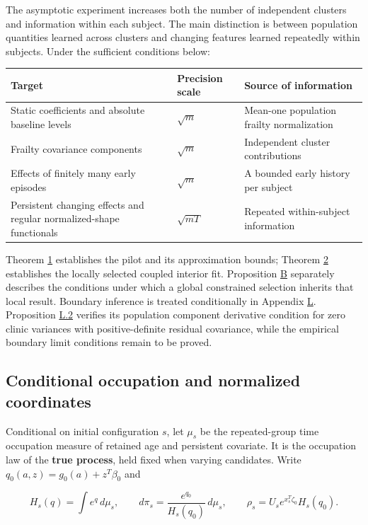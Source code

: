 \documentclass[11pt]{article}
\begin{document}
The asymptotic experiment increases both the number of independent clusters and information within each subject. The main distinction is between population quantities learned across clusters and changing features learned repeatedly within subjects. Under the sufficient conditions below:

{\footnotesize\setlength{\tabcolsep}{4pt}
\begin{longtable}{P{240pt}P{59pt}P{145pt}}
\toprule
\textbf{Target} & \textbf{Precision scale} & \textbf{Source of information} \\
\midrule
\endhead
\bottomrule
\endlastfoot
Static coefficients and absolute baseline levels & \(\sqrt m\) & Mean-one population frailty normalization \\
Frailty covariance components & \(\sqrt m\) & Independent cluster contributions \\
Effects of finitely many early episodes & \(\sqrt m\) & A bounded early history per subject \\
Persistent changing effects and regular normalized-shape functionals & \(\sqrt{mT}\) & Repeated within-subject information \\
\end{longtable}}

Theorem \hyperref[res:Theorem-1]{1} establishes the pilot and its approximation bounds; Theorem \hyperref[res:Theorem-2]{2} establishes the locally selected coupled interior fit. Proposition \hyperref[res:Proposition-B]{B} separately describes the conditions under which a global constrained selection inherits that local result. Boundary inference is treated conditionally in Appendix \hyperref[sec:L]{L}. Proposition \hyperref[res:Proposition-L.2]{L.2} verifies its population component derivative condition for zero clinic variances with positive-definite residual covariance, while the empirical boundary limit conditions remain to be proved.

\subsection{Conditional occupation and normalized coordinates}\label{sec:4.1}

Conditional on initial configuration \(s\), let \(\mu_s\) be the repeated-group time occupation measure of retained age and persistent covariate. It is the occupation law of the \textbf{true process}, held fixed when varying candidates. Write \(q_0(a,z)=g_0(a)+z^T\beta_0\) and

\begin{equation*}
H_s(q)=\int e^q\,d\mu_s,\qquad
d\pi_s=\frac{e^{q_0}}{H_s(q_0)}\,d\mu_s,\qquad
\rho_s=U_s e^{x_s^T\zeta_0}H_s(q_0).
\tag{40}\label{eq:40}
\end{equation*}
\end{document}
